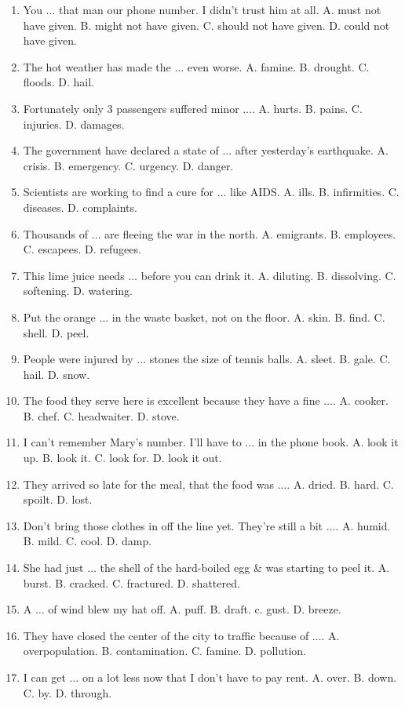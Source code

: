 \documentclass{article}
\numberwithin{equation}{section}
\begin{document}
\begin{enumerate}[leftmargin=2mm]
	\item You $\ldots$ that man our phone number. I didn't trust him at all. A. must not have given. B. might not have given. C. should not have given. D. could not have given.
	\item The hot weather has made the $\ldots$ even worse. A. famine. B. drought. C. floods. D. hail.
	\item Fortunately only 3 passengers suffered minor $\ldots$. A. hurts. B. pains. C. injuries. D. damages.
	\item The government have declared a state of $\ldots$ after yesterday's earthquake. A. crisis. B. emergency. C. urgency. D. danger.
	\item Scientists are working to find a cure for $\ldots$ like AIDS. A. ills. B. infirmities. C. diseases. D. complaints.
	\item Thousands of $\ldots$ are fleeing the war in the north. A. emigrants. B. employees. C. escapees. D. refugees.
	\item This lime juice needs $\ldots$ before you can drink it. A. diluting. B. dissolving. C. softening. D. watering.
	\item Put the orange $\ldots$ in the waste basket, not on the floor. A. skin. B. find. C. shell. D. peel.
	\item People were injured by $\ldots$ stones the size of tennis balls. A. sleet. B. gale. C. hail. D. snow.
	\item The food they serve here is excellent because they have a fine $\ldots$. A. cooker. B. chef. C. headwaiter. D. stove.
	\item I can't remember Mary's number. I'll have to $\ldots$ in the phone book. A. look it up. B. look it. C. look for. D. look it out.
	\item They arrived so late for the meal, that the food was $\ldots$. A. dried. B. hard. C. spoilt. D. lost.
	\item Don't bring those clothes in off the line yet. They're still a bit $\ldots$. A. humid. B. mild. C. cool. D. damp.
	\item She had just $\ldots$ the shell of the hard-boiled egg \& was starting to peel it. A. burst. B. cracked. C. fractured. D. shattered.
	\item A $\ldots$ of wind blew my hat off. A. puff. B. draft. c. gust. D. breeze.
	\item They have closed the center of the city to traffic because of $\ldots$. A. overpopulation. B. contamination. C. famine. D. pollution.
	\item I can get $\ldots$ on a lot less now that I don't have to pay rent. A. over. B. down. C. by. D. through.

\end{enumerate}
\end{document}
